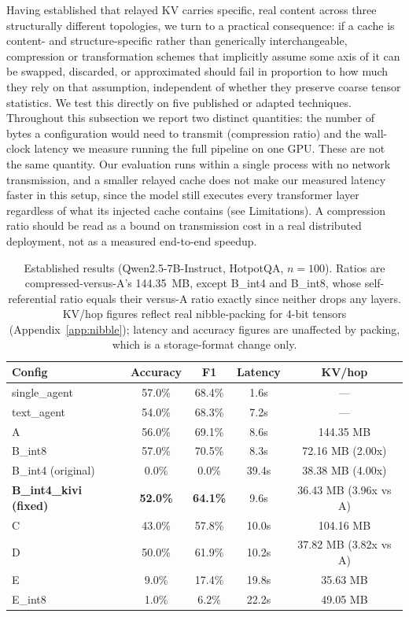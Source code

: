 \documentclass[11pt]{article}
\begin{document}
Having established that relayed KV carries specific, real content across
three structurally different topologies, we turn to a practical
consequence: if a cache is content- and structure-specific rather than
generically interchangeable, compression or transformation schemes that
implicitly assume some axis of it can be swapped, discarded, or
approximated should fail in proportion to how much they rely on that
assumption, independent of whether they preserve coarse tensor
statistics. We test this directly on five published or adapted
techniques. Throughout this subsection we report two distinct
quantities: the number of bytes a configuration would need to transmit
(compression ratio) and the wall-clock latency we measure running the
full pipeline on one GPU. These are not the same quantity. Our evaluation
runs within a single process with no network transmission, and a smaller
relayed cache does not make our measured latency faster in this setup,
since the model still executes every transformer layer regardless of
what its injected cache contains (see Limitations). A compression ratio
should be read as a bound on transmission cost in a real distributed
deployment, not as a measured end-to-end speedup.

\begin{table}[t]
\centering
\small
\begin{tabular}{lcccc}
\toprule
\textbf{Config} & \textbf{Accuracy} & \textbf{F1} & \textbf{Latency} & \textbf{KV/hop} \\
\midrule
single\_agent & 57.0\% & 68.4\% & 1.6s & --- \\
text\_agent & 54.0\% & 68.3\% & 7.2s & --- \\
A & 56.0\% & 69.1\% & 8.6s & 144.35 MB \\
B\_int8 & 57.0\% & 70.5\% & 8.3s & 72.16 MB (2.00x) \\
B\_int4 (original) & 0.0\% & 0.0\% & 39.4s & 38.38 MB (4.00x) \\
\textbf{B\_int4\_kivi (fixed)} & \textbf{52.0\%} & \textbf{64.1\%} & 9.6s & 36.43 MB (3.96x vs A) \\
C & 43.0\% & 57.8\% & 10.0s & 104.16 MB \\
D & 50.0\% & 61.9\% & 10.2s & 37.82 MB (3.82x vs A) \\
E & 9.0\% & 17.4\% & 19.8s & 35.63 MB \\
E\_int8 & 1.0\% & 6.2\% & 22.2s & 49.05 MB \\
\bottomrule
\end{tabular}
\caption{Established results (Qwen2.5-7B-Instruct, HotpotQA, $n=100$).
Ratios are compressed-versus-A's 144.35~MB, except B\_int4 and B\_int8,
whose self-referential ratio equals their versus-A ratio exactly since
neither drops any layers. KV/hop figures reflect real nibble-packing for
4-bit tensors (Appendix~\ref{app:nibble}); latency and accuracy figures
are unaffected by packing, which is a storage-format change only.}
\label{tab:main}
\end{table}
\end{document}
